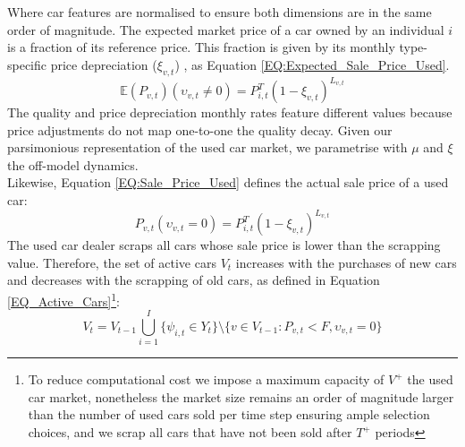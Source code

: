 \documentclass[12pt]{article}
\begin{document}
	Where car features are normalised to ensure both dimensions are in the same order of magnitude.
	The expected market price of a car owned by an individual $i$ is a fraction of its reference price. This fraction is given by its monthly type-specific price depreciation ($\xi_{v,t}$) \citep{SCHLOTER20222Depreciation}, as Equation \ref{EQ:Expected_Sale_Price_Used}.
	\begin{equation}
		\mathbb{E}({P}_{v,t})\left(\upsilon_{v,t}\neq0\right) = P^T_{i,t}(1-\xi_{v,t})^{L_{v,t}}
		\label{EQ:Expected_Sale_Price_Used}
	\end{equation}
	The quality and price depreciation monthly rates feature different values because price adjustments do not map one-to-one the quality decay. Given our parsimonious representation of the used car market, we parametrise with $\mu$ and $\xi$ the off-model dynamics.\\
	Likewise, Equation \ref{EQ:Sale_Price_Used} defines the actual sale price of a used car:
	\begin{equation}
		{P}_{v,t}\left(\upsilon_{v,t}=0\right) = P^T_{i,t}(1-\xi_{v,t})^{L_{v,t}}
		\label{EQ:Sale_Price_Used}
	\end{equation}
	The used car dealer scraps all cars whose sale price is lower than the scrapping value. Therefore, the set of active cars $V_t$ increases with the purchases of new cars and decreases with the scrapping of old cars, as defined in Equation \ref{EQ_Active_Cars}\footnote{To reduce computational cost we impose a maximum capacity of $V^+$ the used car market, nonetheless the market size remains an order of magnitude larger than the number of used cars sold per time step ensuring ample selection choices, and we scrap all cars that have not been sold after $T^+$ periods}: 
	\begin{equation}
		V_t = V_{t-1} \bigcup_{i=1}^{I} \{ \psi_{i,t} \in Y_t\}\setminus\{v\in{V_{t-1}}:P_{v,t}<F,\upsilon_{v,t}=0\}
		\label{EQ_Active_Cars}
	\end{equation}
	
\end{document}

